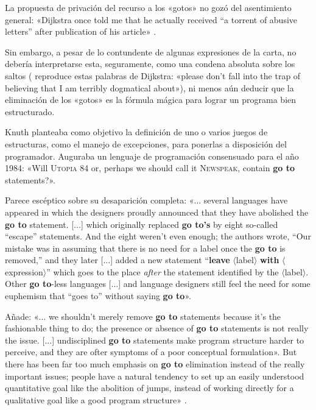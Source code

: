 \documentclass{tfg_domingo}
\begin{document}
La propuesta de privación del recurso a los «gotos» no gozó
del asentimiento general: «Dijkstra once told me that he
actually received “a torrent of abusive letters” after
publication of his article» \citep[p. 265]{1974_Knuth}.

Sin embargo, a pesar de lo contundente de algunas
expresiones de la carta, no debería interpretarse esta,
seguramente, como una condena absoluta sobre los saltos
(\citet{1974_Knuth} reproduce estas palabras de Dijkstra:
«please don’t fall into the trap of believing that I am
terribly dogmatical about»), ni menos aún deducir que la
eliminación de los «gotos» es la fórmula mágica para lograr
un programa bien estructurado.

Knuth planteaba como objetivo la definición de uno o varios
juegos de estructuras, como el manejo de excepciones, para
ponerlas a disposición del programador. Auguraba un lenguaje
de programación consensuado para el año 1984: «Will
\textsc{Utopia 84} or, perhaps we should call it
\textsc{Newspeak}, contain {\bf go to} statements?».

Parece escéptico sobre su desaparición completa:
«... several languages have appeared in which the designers
proudly announced that they have abolished the \textbf{go
  to} statement. [...] which originally replaced \textbf{go
  to’s} by eight so-called “escape” statements. And the
eight weren’t even enough; the authors wrote, “Our mistake
was in assuming that there is no need for a label once the
\textbf{go to} is removed,” and they later [...] added a new
statement “\textbf{leave} $\langle$label$\rangle$
\textbf{with} $\langle$expression$\rangle$” which goes to
the place \emph{after} the statement identified by the
$\langle$label$\rangle$. Other \textbf{go to}-less languages
[...] and language designers still feel the need for some
euphemism that “goes to” without saying \textbf{go to}».

Añade: «... we shouldn’t merely remove \textbf{go to}
statements because it’s the fashionable thing to do; the
presence or absence of \textbf{go to} statements is not
really the issue. [...] undisciplined \textbf{go to}
statements make program structure harder to perceive, and
they are ofter symptoms of a poor conceptual
formulation». But there has been far too much emphasis on
\textbf{go to} elimination instead of the really important
issues; people have a natural tendency to set up an easily
understood quantitative goal like the abolition of jumps,
instead of working directly for a qualitative goal like a
good program structure» \citep{1974_Knuth}.
\end{document}
